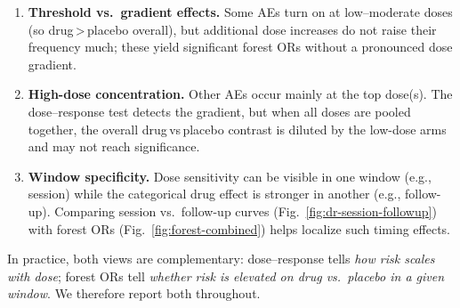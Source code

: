 \begin{enumerate}
  \item \textbf{Threshold vs.\ gradient effects.} Some AEs turn on at low–moderate doses (so drug\,>\,placebo overall), but additional dose increases do not raise their frequency much; these yield significant forest ORs without a pronounced dose gradient.
  \item \textbf{High-dose concentration.} Other AEs occur mainly at the top dose(s). The dose–response test detects the gradient, but when all doses are pooled together, the overall drug\,vs\,placebo contrast is diluted by the low-dose arms and may not reach significance.
  \item \textbf{Window specificity.} Dose sensitivity can be visible in one window (e.g., session) while the categorical drug effect is stronger in another (e.g., follow-up). Comparing session vs.\ follow-up curves (Fig.~\ref{fig:dr-session-followup}) with forest ORs (Fig.~\ref{fig:forest-combined}) helps localize such timing effects.
\end{enumerate}

In practice, both views are complementary: dose–response tells \emph{how risk scales with dose}; forest ORs tell \emph{whether risk is elevated on drug vs.\ placebo in a given window}. We therefore report both throughout.
